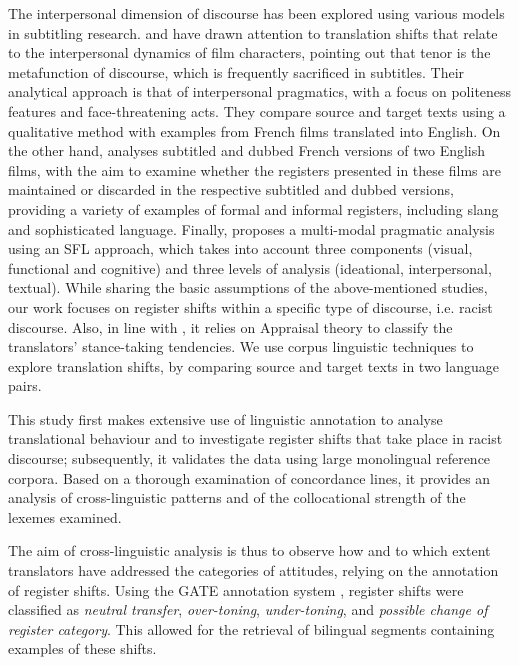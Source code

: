 \documentclass[output=paper]{LSP/langsci}
\begin{document}
The interpersonal dimension of discourse has been explored using various models in subtitling research. \citet[78-96]{Hatim1997} and \citet{Mason2001} have drawn attention to translation shifts that relate to the interpersonal dynamics of film characters, pointing out that tenor is the metafunction of discourse, which is frequently sacrificed in subtitles. Their analytical approach is that of interpersonal pragmatics, with a focus on politeness features and face-threatening acts. They compare source and target texts using a qualitative method with examples from French films translated into English. On the other hand, \citet{Pettit2005} analyses subtitled and dubbed French versions of two English films, with the aim to examine whether the registers presented in these films are maintained or discarded in the respective subtitled and dubbed versions, providing a variety of examples of formal and informal registers, including slang and sophisticated language. Finally, \citet{Mubenga2009} proposes a multi-modal pragmatic analysis using an SFL approach, which takes into account three components (visual, functional and cognitive) and three levels of analysis (ideational, interpersonal, textual). While sharing the basic assumptions of the above-mentioned studies, our work focuses on register shifts within a specific type of discourse, i.e. racist discourse. Also, in line with \citet{Munday2012}, it relies on Appraisal theory to classify the translators' stance-taking tendencies. We use corpus linguistic techniques to explore translation shifts, by comparing source and target texts in two language pairs.

This study first makes extensive use of linguistic annotation to analyse translational behaviour and to investigate register shifts that take place in racist discourse; subsequently, it validates the data using large monolingual reference corpora. Based on a thorough examination of concordance lines, it provides an analysis of cross-linguistic patterns and of the collocational strength of the lexemes examined.

The aim of cross-linguistic analysis is thus to observe how and to which extent translators have addressed the categories of attitudes, relying on the annotation of register shifts. Using the GATE annotation system \citep{Cunningham2002}, register shifts were classified as \textit{neutral transfer}, \textit{over-toning}, \textit{under-toning}, and \textit{possible change of register category}. This allowed for the retrieval of bilingual segments containing examples of these shifts.
\end{document}
